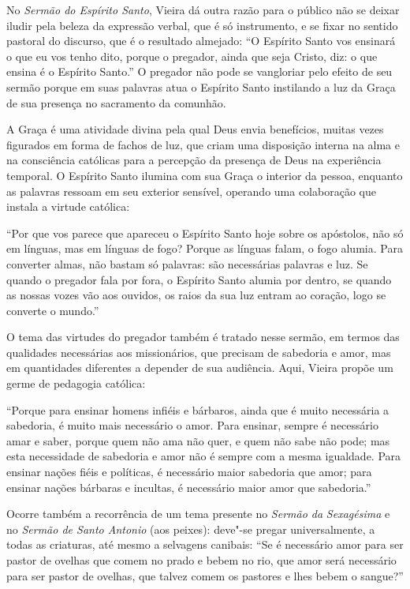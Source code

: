 No \emph{Sermão do Espírito Santo}, Vieira dá outra razão para o público
não se deixar iludir pela beleza da expressão verbal, que é só
instrumento, e se fixar no sentido pastoral do discurso, que é o
resultado almejado: ``O Espírito Santo vos ensinará o que eu vos tenho
dito, porque o pregador, ainda que seja Cristo, diz: o que ensina é o
Espírito Santo.'' O pregador não pode se vangloriar pelo efeito de seu
sermão porque em suas palavras atua o Espírito Santo instilando a luz da
Graça de sua presença no sacramento da comunhão.

A Graça é uma atividade divina pela qual Deus envia benefícios, muitas
vezes figurados em forma de fachos de luz, que criam uma disposição
interna na alma e na consciência católicas para a percepção da presença
de Deus na experiência temporal. O Espírito Santo ilumina com sua Graça
o interior da pessoa, enquanto as palavras ressoam em seu exterior
sensível, operando uma colaboração que instala a virtude católica:

``Por que vos parece que apareceu o Espírito Santo hoje sobre os
apóstolos, não só em línguas, mas em línguas de fogo? Porque as línguas
falam, o fogo alumia. Para converter almas, não bastam só palavras: são
necessárias palavras e luz. Se quando o pregador fala por fora, o
Espírito Santo alumia por dentro, se quando as nossas vozes vão aos
ouvidos, os raios da sua luz entram ao coração, logo se converte o
mundo.''

O tema das virtudes do pregador também é tratado nesse sermão, em termos
das qualidades necessárias aos missionários, que precisam de sabedoria e
amor, mas em quantidades diferentes a depender de sua audiência. Aqui,
Vieira propõe um germe de pedagogia católica:

``Porque para ensinar homens infiéis e bárbaros, ainda que é muito
necessária a sabedoria, é muito mais necessário o amor. Para ensinar,
sempre é necessário amar e saber, porque quem não ama não quer, e quem
não sabe não pode; mas esta necessidade de sabedoria e amor não é sempre
com a mesma igualdade. Para ensinar nações fiéis e políticas, é
necessário maior sabedoria que amor; para ensinar nações bárbaras e
incultas, é necessário maior amor que sabedoria.''

Ocorre também a recorrência de um tema presente no \emph{Sermão da}
\emph{Sexagésima} e no \emph{Sermão de Santo Antonio} (aos peixes):
deve"-se pregar universalmente, a todas as criaturas, até mesmo a
selvagens canibais: ``Se é necessário amor para ser pastor de ovelhas
que comem no prado e bebem no rio, que amor será necessário para ser
pastor de ovelhas, que talvez comem os pastores e lhes bebem o sangue?''

